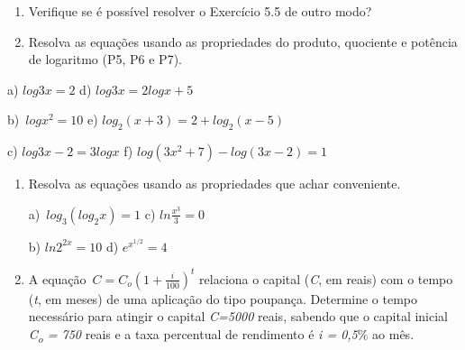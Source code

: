 \documentclass[12pt]{article}
\begin{document}
\begin{enumerate}[label*={\fontsize{14pt}{14pt}\selectfont \textbf{\arabic*.}}]
\begin{enumerate}
	\item Verifique se é possível resolver o Exercício 5.5 de outro modo?\par

	\item Resolva as equações usando as propriedades do produto, quociente e potência de logaritmo (P5, P6 e P7).
\end{enumerate}\par

\begin{adjustwidth}{0.2in}{0.0in}
\begin{justify}
a)  \( log3x=2  \) \tab \tab \tab \tab d)  \( log3x=2logx+5 \) 
\end{justify}\par

\end{adjustwidth}

\begin{adjustwidth}{0.2in}{0.0in}
\begin{justify}
b)\   \( logx^{2}=10 \) \tab \tab \tab e)  \( log_{2} \left( x+3 \right) =2+log_{2} \left( x-5 \right)  \) 
\end{justify}\par

\end{adjustwidth}

\begin{adjustwidth}{0.2in}{0.0in}
\begin{justify}
c)  \( log3x-2=3logx \) \tab \tab f)  \( log \left( 3x^{2}+7 \right) -log \left( 3x-2 \right) =1 \) 
\end{justify}\par

\end{adjustwidth}

\begin{enumerate}[label*={\fontsize{12pt}{12pt}\selectfont \arabic*.}]
	\item Resolva as equações usando as propriedades que achar conveniente.\par

a)\   \( log_{3} \left( log_{2}x \right) =1 \) \tab \tab \tab c)  \( ln\frac{x^{3}}{3}= 0 _{} \) \  \par

b)  \( ln2^{2x}=10 \) \tab \tab \tab d)  \( e^{x^{1/2}}=4 \) \par

	\item A equação\   \( C=C_{o} \left( 1+\frac{i}{100} \right) ^{t} \)  relaciona o capital (\textit{C}, em reais) com o tempo (\textit{t}, em meses) de uma aplicação do tipo poupança. Determine o tempo necessário para atingir o capital \textit{C=5000} reais, sabendo que o capital inicial \textit{C\textsubscript{o} = 750} reais e a taxa percentual de rendimento é \textit{i = 0,5$\%$  }ao mês.\par


\end{enumerate}
\end{enumerate}
\end{document}

